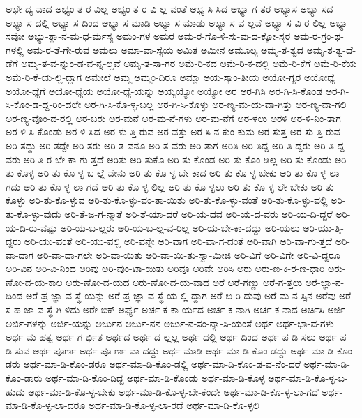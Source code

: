 {ಅಭೇ-ದ್ಯ-ವಾದ
ಅಭ್ಯಂ-ತ-ರ-ವಿಲ್ಲ
ಅಭ್ಯಂ-ತ-ರ-ವಿ-ಲ್ಲ-ವಂತೆ
ಅಭ್ಯ-ಸಿ-ಸಿದ
ಅಭ್ಯಾ-ಗ-ತರ
ಅಭ್ಯಾಸ
ಅಭ್ಯಾ-ಸದ
ಅಭ್ಯಾ-ಸ-ದಲ್ಲಿ
ಅಭ್ಯಾ-ಸ-ದಿಂದ
ಅಭ್ಯಾ-ಸ-ಮಾಡಿ
ಅಭ್ಯಾ-ಸ-ಮಾಡು
ಅಭ್ಯಾ-ಸ-ವ-ಲ್ಲವೆ
ಅಭ್ಯಾ-ಸ-ವಿ-ರ-ಲಿಲ್ಲ
ಅಭ್ಯಾ-ಸವೋ
ಅಭ್ಯು-ತ್ಥಾ-ನ-ಮ-ಧ-ರ್ಮಸ್ಯ
ಅಮಂ-ಗಳ
ಅಮರ
ಅಮ-ರ-ಗೊ-ಳಿ-ಸು-ವು-ದ-ಕ್ಕೋ-ಸ್ಕರ
ಅಮ-ರ-ಗ್ರಂ-ಥ-ಗಳಲ್ಲಿ
ಅಮ-ರ-ತೆ-ಗೇ-ರುವ
ಅಮಲು
ಅಮಾ-ವಾ-ಸ್ಯೆಯ
ಅಮಿತ
ಅಮೀನ
ಅಮೂಲ್ಯ
ಅಮೃ-ತ-ತ್ವದ
ಅಮೃ-ತ-ತ್ವ-ದೆ-ಡೆಗೆ
ಅಮೃ-ತ-ವ-ನ್ನುಂ-ಡ-ವ-ನ್ನ-ಲ್ಲವೆ
ಅಮೃ-ತ-ಸಾ-ಗರ
ಅಮೆ-ರಿ-ಕದ
ಅಮೆ-ರಿ-ಕ-ದಲ್ಲಿ
ಅಮೆ-ರಿ-ಕೆಗೆ
ಅಮೆ-ರಿ-ಕೆಯ
ಅಮೆ-ರಿ-ಕೆ-ಯ-ಲ್ಲಿ-ದ್ದಾಗ
ಅಮೇಲೆ
ಅಮ್ಮ
ಅಮ್ಮಂ-ದಿರೂ
ಅಮ್ಮಾ
ಅಯ-ಸ್ಕಾಂ-ತೀಯ
ಅಯೋ-ಗ್ಯರ
ಅಯೋಧ್ಯೆ
ಅಯೋ-ಧ್ಯೆಗೆ
ಅಯೋ-ಧ್ಯೆಯ
ಅಯೋ-ಧ್ಯೆ-ಯನ್ನು
ಅಯ್ಯಯ್ಯೋ
ಅಯ್ಯೋ
ಅರ
ಅರ-ಗಿಸಿ
ಅರ-ಗಿ-ಸಿ-ಕೊಂಡ
ಅರ-ಗಿ-ಸಿ-ಕೊಂ-ಡ-ದ್ದ-ರಿಂ-ದಲೇ
ಅರ-ಗಿ-ಸಿ-ಕೊ-ಳ್ಳ-ಬಲ್ಲ
ಅರ-ಗಿ-ಸಿ-ಕೊಳ್ಳು
ಅರ-ಣ್ಯ-ಮ-ಯ-ವಾ-ಗಿತ್ತು
ಅರ-ಣ್ಯ-ವಾ-ಗಲಿ
ಅರ-ಣ್ಯ-ವೊಂ-ದ-ರಲ್ಲಿ
ಅರ-ಬರು
ಅರ-ಮನೆ
ಅರ-ಮ-ನೆ-ಗಳು
ಅರ-ಮ-ನೆಗೆ
ಅರ-ಳಲು
ಅರಳಿ
ಅರ-ಳಿ-ನಿಂ-ತಾಗ
ಅರ-ಳಿ-ಸಿ-ಕೊಂಡು
ಅರ-ಳಿ-ಸಿದ
ಅರ-ಳು-ತ್ತಿ-ರುವ
ಅರ-ವತ್ತು
ಅರ-ಸಿ-ನ-ಕುಂ-ಕುಮ
ಅರ-ಸುತ್ತ
ಅರ-ಸು-ತ್ತಿ-ರುವ
ಅರಿ-ತದ್ದು
ಅರಿ-ತದ್ದೇ
ಅರಿ-ತರು
ಅರಿ-ತ-ವನೂ
ಅರಿ-ತ-ವರು
ಅರಿ-ತಾಗ
ಅರಿತಿ
ಅರಿ-ತಿದ್ದ
ಅರಿ-ತಿ-ದ್ದರು
ಅರಿ-ತಿ-ದ್ದ-ವರು
ಅರಿ-ತಿ-ರ-ಬೇ-ಕಾ-ಗು-ತ್ತದೆ
ಅರಿತು
ಅರಿ-ತುಕೊ
ಅರಿ-ತು-ಕೊಂಡ
ಅರಿ-ತು-ಕೊಂ-ಡಿಲ್ಲ
ಅರಿ-ತು-ಕೊಂಡು
ಅರಿ-ತು-ಕೊಳ್ಳ
ಅರಿ-ತು-ಕೊ-ಳ್ಳ-ಬ-ಲ್ಲೆ-ವೇನು
ಅರಿ-ತು-ಕೊ-ಳ್ಳ-ಬೇ-ಕಾದ
ಅರಿ-ತು-ಕೊ-ಳ್ಳ-ಬೇಕು
ಅರಿ-ತು-ಕೊ-ಳ್ಳ-ಲಾ-ಗದು
ಅರಿ-ತು-ಕೊ-ಳ್ಳ-ಲಾ-ಗದೆ
ಅರಿ-ತು-ಕೊ-ಳ್ಳ-ಲಿಲ್ಲ
ಅರಿ-ತು-ಕೊ-ಳ್ಳಲು
ಅರಿ-ತು-ಕೊ-ಳ್ಳ-ಲೇ-ಬೇಕು
ಅರಿ-ತು-ಕೊಳ್ಳು
ಅರಿ-ತು-ಕೊ-ಳ್ಳುವ
ಅರಿ-ತು-ಕೊ-ಳ್ಳು-ವಂ-ತಾ-ಯಿತು
ಅರಿ-ತು-ಕೊ-ಳ್ಳು-ವಂತೆ
ಅರಿ-ತು-ಕೊ-ಳ್ಳು-ವಲ್ಲಿ
ಅರಿ-ತು-ಕೊ-ಳ್ಳು-ವುದು
ಅರಿ-ತೆ-ಜ-ಗ-ನ್ಮಾತೆ
ಅರಿ-ತೆ-ಯಾ-ದರೆ
ಅರಿ-ಯ-ದವ
ಅರಿ-ಯ-ದ-ವರು
ಅರಿ-ಯ-ದಿ-ದ್ದರೆ
ಅರಿ-ಯ-ದಿ-ರು-ವಷ್ಟು
ಅರಿ-ಯ-ಬ-ಲ್ಲರು
ಅರಿ-ಯ-ಬ-ಲ್ಲ-ವ-ರಿಲ್ಲ
ಅರಿ-ಯ-ಬೇ-ಕಾ-ದದ್ದು
ಅರಿ-ಯಲು
ಅರಿ-ಯು-ತ್ತಿ-ದ್ದರು
ಅರಿ-ಯು-ವಂತೆ
ಅರಿ-ಯು-ವಲ್ಲಿ
ಅರಿ-ವನ್ನೇ
ಅರಿ-ವಾಗ
ಅರಿ-ವಾ-ಗ-ದಂತೆ
ಅರಿ-ವಾಗಿ
ಅರಿ-ವಾ-ಗು-ತ್ತದೆ
ಅರಿ-ವಾ-ದಾಗ
ಅರಿ-ವಾ-ದಾ-ಗಲೇ
ಅರಿ-ವಾ-ಯಿತು
ಅರಿ-ವಾ-ಯಿ-ತು-ಸ್ವಾ-ಮೀಜಿ
ಅರಿ-ವಿಗೆ
ಅರಿ-ವಿಗೇ
ಅರಿ-ವಿ-ದ್ದರೂ
ಅರಿ-ವಿನ
ಅರಿ-ವಿ-ನಿಂದ
ಅರಿವು
ಅರಿ-ವುಂ-ಟಾ-ಯಿತು
ಅರಿವೂ
ಅರಿವೇ
ಅರಿಸಿ
ಅರು
ಅರು-ಣ-ಕಿ-ರ-ಣ-ಧಾರಿ
ಅರು-ಣೋ-ದ-ಯ-ಕಾಲ
ಅರು-ಣೋ-ದ-ಯದ
ಅರು-ಣೋ-ದ-ಯ-ವಾದ
ಅರೆ
ಅರೆ-ಗಣ್ಣು
ಅರೆ-ಗ-ತ್ತಲು
ಅರೆ-ಜ್ಞಾ-ನ-ದಿಂದ
ಅರೆ-ಪ್ರ-ಜ್ಞಾ-ವ-ಸ್ಥೆ-ಯನ್ನು
ಅರೆ-ಪ್ರ-ಜ್ಞಾ-ವ-ಸ್ಥೆ-ಯ-ಲ್ಲಿ-ದ್ದಾಗ
ಅರೆ-ಬಿ-ರಿ-ದುವು
ಅರೆ-ಮ-ನ-ಸ್ಸಿನ
ಅರೆವು
ಅರೆ-ಸ-ಹ-ಜಾ-ವ-ಸ್ಥೆ-ಗಿ-ಳಿದು
ಅರೇ-ಬಿಕ್
ಅರ್ಘ್ಯ
ಅರ್ಚ-ಕ-ಕಾ-ರ್ಯದ
ಅರ್ಚ-ಕ-ನಾಗಿ
ಅರ್ಚ-ಕ-ನಾದ
ಅರ್ಚಿಸಿ
ಅರ್ಜಿ
ಅರ್ಜಿ-ಗಳನ್ನು
ಅರ್ಜಿ-ಯನ್ನು
ಅರ್ಜುನ
ಅರ್ಜು-ನನ
ಅರ್ಜು-ನ-ಸಂ-ನ್ಯಾ-ಸಿ-ಯಂತೆ
ಅರ್ಥ
ಅರ್ಥ-ಭಾ-ವ-ಗಳು
ಅರ್ಥ-ಮ-ಹತ್ವ
ಅರ್ಥ-ಗ-ರ್ಭಿತ
ಅರ್ಥದ
ಅರ್ಥ-ದ-ಲ್ಲಲ್ಲ
ಅರ್ಥ-ದಲ್ಲಿ
ಅರ್ಥ-ದಿಂದ
ಅರ್ಥ-ಪ-ಡಿ-ಸಲು
ಅರ್ಥ-ಪ-ಡಿ-ಸುವ
ಅರ್ಥ-ಪೂರ್ಣ
ಅರ್ಥ-ಪೂ-ರ್ಣ-ವಾ-ದದ್ದು
ಅರ್ಥ-ಮಾಡಿ
ಅರ್ಥ-ಮಾ-ಡಿ-ಕೊಂ-ಡದ್ದು
ಅರ್ಥ-ಮಾ-ಡಿ-ಕೊಂ-ಡರು
ಅರ್ಥ-ಮಾ-ಡಿ-ಕೊಂ-ಡರೂ
ಅರ್ಥ-ಮಾ-ಡಿ-ಕೊಂ-ಡಲ್ಲಿ
ಅರ್ಥ-ಮಾ-ಡಿ-ಕೊಂ-ಡ-ವ-ನೆಂ-ದರೆ
ಅರ್ಥ-ಮಾ-ಡಿ-ಕೊಂ-ಡಾರು
ಅರ್ಥ-ಮಾ-ಡಿ-ಕೊಂ-ಡಿದ್ದ
ಅರ್ಥ-ಮಾ-ಡಿ-ಕೊಂಡು
ಅರ್ಥ-ಮಾ-ಡಿ-ಕೊಳ್ಳ
ಅರ್ಥ-ಮಾ-ಡಿ-ಕೊ-ಳ್ಳ-ಬ-ಹುದು
ಅರ್ಥ-ಮಾ-ಡಿ-ಕೊ-ಳ್ಳ-ಬೇಕು
ಅರ್ಥ-ಮಾ-ಡಿ-ಕೊ-ಳ್ಳ-ಬೇ-ಕೆಂದೇ
ಅರ್ಥ-ಮಾ-ಡಿ-ಕೊ-ಳ್ಳ-ಲಾ-ಗದೆ
ಅರ್ಥ-ಮಾ-ಡಿ-ಕೊ-ಳ್ಳ-ಲಾ-ದರೂ
ಅರ್ಥ-ಮಾ-ಡಿ-ಕೊ-ಳ್ಳ-ಲಾ-ರದೆ
ಅರ್ಥ-ಮಾ-ಡಿ-ಕೊ-ಳ್ಳಲಿ
}
